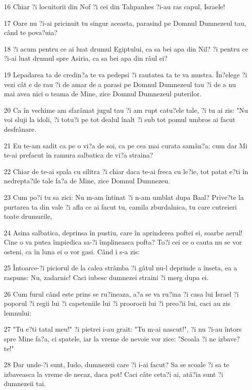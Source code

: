 \par 16 Chiar ?i locuitorii din Nof ?i cei din Tahpanhes ?i-au ras capul, Israele!
\par 17 Oare nu ?i-ai pricinuit tu singur aceasta, parasind pe Domnul Dumnezeul tau, când te pova?uia?
\par 18 ?i acum pentru ce ai luat drumul Egiptului, ca sa bei apa din Nil? ?i pentru ce ?i-ai luat drumul spre Asiria, ca sa bei apa din râul ei?
\par 19 Lepadarea ta de credin?a te va pedepsi ?i rautatea ta te va mustra. În?elege ?i vezi cât e de rau ?i de amar de a parasi pe Domnul Dumnezeul tau ?i de a nu mai avea nici o teama de Mine, zice Domnul Dumnezeul puterilor.
\par 20 Ca în vechime am sfarâmat jugul tau ?i am rupt catu?ele tale, ?i tu ai zis: "Nu voi sluji la idoli, ?i totu?i pe tot dealul înalt ?i sub tot pomul umbros ai facut desfrânare.
\par 21 Eu te-am sadit ca pe o vi?a de soi, ca pe cea mai curata samân?a; cum dar Mi te-ai prefacut în ramura salbatica de vi?a straina?
\par 22 Chiar de te-ai spala cu silitra ?i chiar daca te-ai freca cu le?ie, tot patat e?ti în nedrepta?ile tale fa?a de Mine, zice Domnul Dumnezeu.
\par 23 Cum po?i tu sa zici: Nu m-am întinat ?i n-am umblat dupa Baal? Prive?te la purtarea ta din vale ?i afla ce ai facut tu, camila zburdalnica, tu care cutreieri toate drumurile,
\par 24 Asina salbatica, deprinsa în pustiu, care în aprinderea poftei ei, soarbe aerul! Cine o va putea împiedica sa-?i împlineasca pofta? To?i cei ce o cauta nu se vor osteni, ca în luna ei o vor gasi. Când i s-a zis:
\par 25 Întoarce-?i piciorul de la calea strâmba ?i gâtul nu-l deprinde a înseta, ea a raspuns: Nu, zadarnic! Caci iubesc dumnezei straini ?i merg dupa ei.
\par 26 Cum furul când este prins se ru?ineaza, a?a se va ru?ina ?i casa lui Israel ?i poporul ?i regii lui ?i capeteniile lui ?i proorocii lui ?i preo?ii lui, caci au zis lemnului:
\par 27 "Tu e?ti tatal meu!" ?i pietrei i-au grait: "Tu m-ai nascut!", ?i nu ?i-au întors spre Mine fa?a, ci spatele, iar la vreme de nevoie vor zice: "Scoala ?i ne izbave?te!"
\par 28 Dar unde-?i sunt, Iudo, dumnezeii care ?i i-ai facut? Sa se scoale ?i sa te izbaveasca la vreme de necaz, daca pot! Caci câte ceta?i ai, atâ?ia sunt ?i dumnezeii tai.
